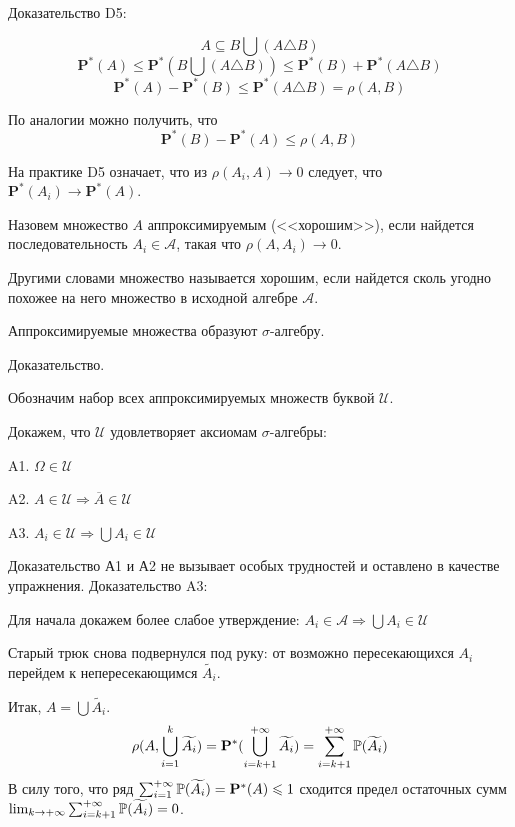 {Доказательство D5:

$$ A\subseteq B\bigcup (A\triangle B) $$
$$ \mathbf{P^{*}}(A)\leq\mathbf{P^{*}}(B\bigcup (A\triangle B))
\leq \mathbf{P^{*}}(B)+\mathbf{P^{*}}(A\triangle B)$$
$$ \mathbf{P^{*}}(A)-\mathbf{P^{*}}(B)\leq \mathbf{P^{*}}(A\triangle
B)= \rho(A,B)$$

По аналогии можно получить, что
$$ \mathbf{P^{*}}(B)-\mathbf{P^{*}}(A)\leq \rho(A,B)$$

На практике D5 означает, что из $\rho(A_{i},A)\rightarrow 0$
следует, что $\mathbf{P^{*}}(A_{i})\rightarrow\mathbf{P^{*}}(A)$.


\begin{mydef}
Назовем множество $A$ аппроксимируемым (<<хорошим>>), если найдется
последовательность $A_{i}\in\mathcal{A}$, такая что
$\rho(A,A_{i})\rightarrow 0$.
\end{mydef}
Другими словами множество называется хорошим, если найдется сколь
угодно похожее на него множество в исходной алгебре $\mathcal{A}$.

\begin{myth}
Аппроксимируемые множества образуют $\sigma$-алгебру.
\end{myth}
Доказательство.

Обозначим набор всех аппроксимируемых множеств буквой
$\mathcal{U}$.

Докажем, что $\mathcal{U}$ удовлетворяет аксиомам
$\sigma$-алгебры:

A1. $\Omega\in\mathcal{U}$

A2. $A\in\mathcal{U}\Rightarrow \overline{A}\in\mathcal{U}$

A3. $A_{i}\in\mathcal{U}\Rightarrow \bigcup A_{i}\in\mathcal{U}$

Доказательство А1 и А2 не вызывает особых трудностей и оставлено в
качестве упражнения. Доказательство A3:

Для начала докажем более слабое утверждение:
$A_{i}\in\mathcal{A}\Rightarrow \bigcup A_{i}\in\mathcal{U}$

Старый трюк снова подвернулся под руку: от возможно пересекающихся
$A_{i}$ перейдем к непересекающимся $\widetilde{A_{i}}$.

Итак, $A=\bigcup \widetilde{A_{i}}$.
$$
\rho(A,\bigcup_{i=1}^{k} \widetilde{A_{i}})=
\mathbf{P^{*}}(\bigcup_{i=k+1}^{+\infty}\widetilde{A_{i}})=
\sum_{i=k+1}^{+\infty}\P(\widetilde{A_{i}})
$$
В силу того, что ряд
$\sum_{i=1}^{+\infty}\P(\widetilde{A_{i}})=\mathbf{P^{*}}(A)\leq 1$
сходится предел остаточных сумм $\lim_{k\rightarrow
+\infty}\sum_{i=k+1}^{+\infty}\P(\widetilde{A_{i}})=0$.

}
